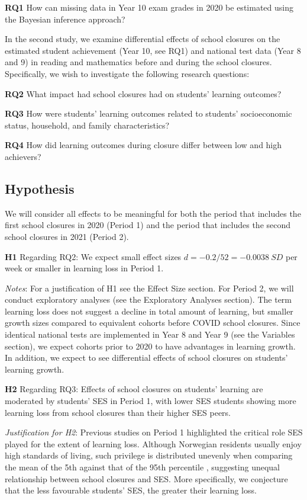 \textbf{RQ1} How can missing data in Year 10 exam grades in 2020 be estimated using the Bayesian inference approach? \label{rq:1}

In the second study, we examine differential effects of school closures on the estimated student achievement (Year 10, see RQ1) and national test data (Year 8 and 9) in reading and mathematics before and during the school closures. Specifically, we wish to investigate the following research questions:

\textbf{RQ2} What impact had school closures had on students' learning outcomes?

\textbf{RQ3} How were students' learning outcomes related to students' socioeconomic status, household, and family characteristics?

\textbf{RQ4} How did learning outcomes during closure differ between low and high achievers?

\subsection{Hypothesis}
We will consider all effects to be meaningful for both the period that includes the first school closures in 2020 (Period 1) and the period that includes the second school closures in 2021 (Period 2).

\textbf{H1} Regarding RQ2: We expect small effect sizes $d=-{0.2}/{52}=-0.0038\ SD$ per week or smaller in learning loss in Period 1.

\textit{Notes}: For a justification of H1 see the Effect Size section. For Period 2, we will conduct exploratory analyses (see the Exploratory Analyses section). The term learning loss does not suggest a decline in total amount of learning, but smaller growth sizes compared to equivalent cohorts before COVID school closures. Since identical national tests are implemented in Year 8 and Year 9 (see the Variables section), we expect cohorts prior to 2020 to have advantages in learning growth. In addition, we expect to see differential effects of school closures on students' learning growth.

\textbf{H2} Regarding RQ3: Effects of school closures on students' learning are moderated by students' SES in Period 1, with lower SES students showing more learning loss from school closures than their higher SES peers.

\textit{Justification for H2}: Previous studies on Period 1 highlighted the critical role SES played for the extent of learning loss. Although Norwegian residents usually enjoy high standards of living, such privilege is distributed unevenly when comparing the mean of the 5th against that of the 95th percentile \parencite{oecd:2019}, suggesting unequal relationship between school closures and SES. More specifically, we conjecture that the less favourable students' SES, the greater their learning loss.

